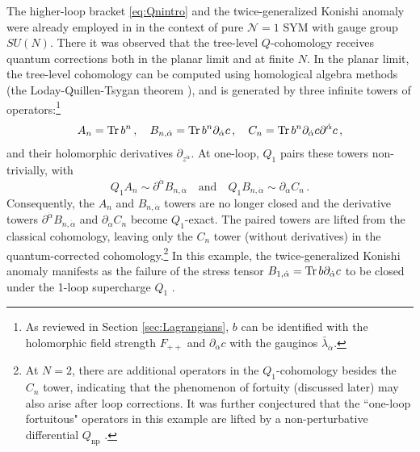 \documentclass[11pt]{article}
\begin{document}
The higher-loop bracket \eqref{eq:Qnintro} and the twice-generalized Konishi anomaly were already employed in \cite{Budzik:2023xbr} in the context of pure $\mathcal{N}=1$ SYM with gauge group $SU(N)$. There it was observed that the tree-level $Q$-cohomology receives quantum corrections both in the planar limit and at finite $N$. In the planar limit, the tree-level cohomology can be computed using homological algebra methods (the Loday-Quillen-Tsygan theorem \cite{Loday1984CyclicHA, Tsygan1983TheHO}), and is generated by three infinite towers of operators:\footnote{As reviewed in Section \ref{sec:Lagrangians}, $b$ can be identified with the holomorphic field strength $F_{++}$ and $\partial_{\dot\alpha}c$ with the gauginos $\bar\lambda_{\dot\alpha}$.}
\begin{equation}
    A_n = \Tr b^n\,,\quad
    B_{n,\dot\alpha} = \Tr b^n \partial_{\dot\alpha} c\,,\quad
    C_n = \Tr b^n \partial_{\dot\alpha}c \partial^{\dot\alpha}c\,,
\end{equation}
and their holomorphic derivatives $\partial_{z^{\dot\alpha}}$. At one-loop, $Q_1$ pairs these towers non-trivially, with 
\begin{equation}
    Q_1 A_n \sim \partial^{\dot\alpha} B_{n,\dot\alpha} 
    \quad\text{and}\quad
    Q_1 B_{n,\dot\alpha} \sim \partial_{\dot\alpha} C_n \,.
\end{equation}
Consequently, the $A_n$ and $B_{n,\dot\alpha}$ towers are no longer closed and the derivative towers $\partial^{\dot\alpha} B_{n,\dot\alpha}$ and $\partial_{\dot\alpha}C_n$ become $Q_1$-exact. The paired towers are lifted from the classical cohomology, leaving only the $C_n$ tower (without derivatives) in the quantum-corrected cohomology.\footnote{At $N=2$, there are additional operators in the $Q_1$-cohomology besides the $C_n$ tower, indicating that the phenomenon of fortuity (discussed later) may also arise after loop corrections. It was further conjectured that the ``one-loop fortuitous" operators in this example are lifted by a non-perturbative differential $Q_{\text{np}}$ \cite{Budzik:2023xbr}.} In this example, the twice-generalized Konishi anomaly manifests as the failure of the stress tensor $B_{1,\dot\alpha}=\Tr b\partial_{\dot\alpha}c$ to be closed under the 1-loop supercharge $Q_1$ \cite{Budzik:2023xbr}. 
\end{document}
